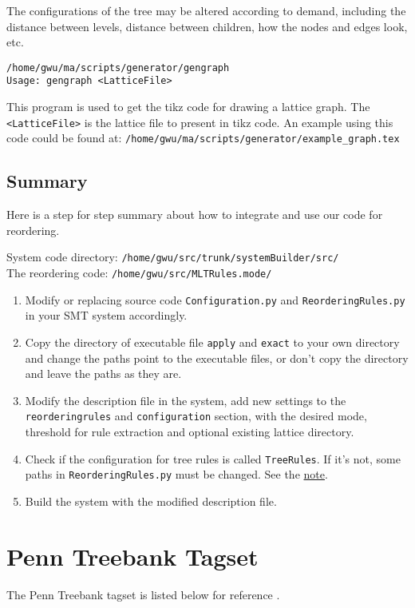 The configurations of the tree may be altered according to demand, including the distance between levels, distance between children, how the nodes and edges look, etc.

\verb|/home/gwu/ma/scripts/generator/gengraph| \\
\verb|Usage: gengraph <LatticeFile>|

This program is used to get the tikz code for drawing a lattice graph. The \verb|<LatticeFile>| is the lattice file to present in tikz code. An example using this code could be found at:
\verb|/home/gwu/ma/scripts/generator/example_graph.tex|
	
\subsection{Summary}
\label{summary}

Here is a step for step summary about how to integrate and use our code for reordering.

System code directory: \verb|/home/gwu/src/trunk/systemBuilder/src/|\\
The reordering code: \verb|/home/gwu/src/MLTRules.mode/|

\begin{enumerate}
\item Modify or replacing source code \verb|Configuration.py| and \verb|ReorderingRules.py| in your SMT system accordingly.
\item Copy the directory of executable file \verb|apply| and \verb|exact| to your own directory and change the paths point to the executable files, or don't copy the directory and leave the paths as they are.
\item Modify the description file in the system, add new settings to the \verb|reorderingrules| and \verb|configuration| section, with the desired mode, threshold for rule extraction and optional existing lattice directory.
\item Check if the configuration for tree rules is called \verb|TreeRules|. If it's not, some paths in \verb|ReorderingRules.py| must be changed. See the \hyperref[note]{note}.
\item Build the system with the modified description file.
\end{enumerate}

\newpage
\section{Penn Treebank Tagset}
\label{tagset}
The Penn Treebank tagset is listed below for reference \citep{penn, penn3}.

